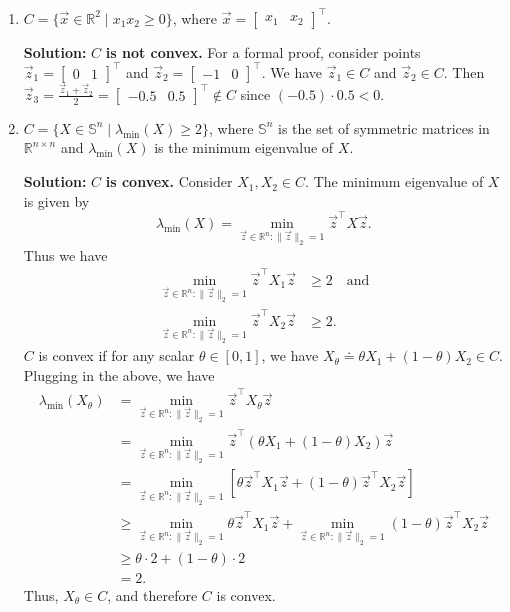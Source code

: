 \documentclass[10pt]{article}
\theoremstyle{definition}
\theoremstyle{plain}
\newcommand{\RR}{\mathbb{R}}
\begin{document}
\begin{enumerate}[label=(\alph*)]
    \item $C = \{\vec{x} \in \RR^2 \mid x_1 x_2 \ge 0\}$, where $\vec{x} = \begin{bmatrix} x_1 & x_2 \end{bmatrix}^\top$.

    \textbf{Solution:} $C$ \textbf{is not convex.} For a formal proof, consider points $\vec{z}_1 = \begin{bmatrix} 0 & 1 \end{bmatrix}^\top$ and $\vec{z}_2 = \begin{bmatrix} -1 & 0 \end{bmatrix}^\top$. We have $\vec{z}_1 \in C$ and $\vec{z}_2 \in C$. Then $\vec{z}_3 = \frac{\vec{z}_1 + \vec{z}_2}{2} = \begin{bmatrix} -0.5 & 0.5 \end{bmatrix}^\top \notin C$ since $(-0.5) \cdot 0.5 < 0$.

    \item $C = \{X \in \mathbb{S}^n \mid \lambda_{\min}(X) \ge 2\}$, where $\mathbb{S}^n$ is the set of symmetric matrices in $\RR^{n \times n}$ and $\lambda_{\min}(X)$ is the minimum eigenvalue of $X$.

    \textbf{Solution:} $C$ \textbf{is convex.} Consider $X_1, X_2 \in C$. The minimum eigenvalue of $X$ is given by
    \begin{equation}
        \lambda_{\min}(X) = \min_{\vec{z} \in \RR^n : \|\vec{z}\|_2 = 1} \vec{z}^\top X \vec{z}.
    \end{equation}
    Thus we have
    \begin{align}
        \min_{\vec{z} \in \RR^n : \|\vec{z}\|_2 = 1} \vec{z}^\top X_1 \vec{z} &\ge 2 \quad \text{and} \\
        \min_{\vec{z} \in \RR^n : \|\vec{z}\|_2 = 1} \vec{z}^\top X_2 \vec{z} &\ge 2.
    \end{align}
    $C$ is convex if for any scalar $\theta \in [0,1]$, we have $X_\theta \doteq \theta X_1 + (1-\theta)X_2 \in C$. Plugging in the above, we have
    \begin{align}
        \lambda_{\min}(X_\theta) &= \min_{\vec{z} \in \RR^n : \|\vec{z}\|_2 = 1} \vec{z}^\top X_\theta \vec{z} \\
        &= \min_{\vec{z} \in \RR^n : \|\vec{z}\|_2 = 1} \vec{z}^\top (\theta X_1 + (1-\theta)X_2) \vec{z} \\
        &= \min_{\vec{z} \in \RR^n : \|\vec{z}\|_2 = 1} \left[\theta \vec{z}^\top X_1 \vec{z} + (1-\theta) \vec{z}^\top X_2 \vec{z}\right] \\
        &\ge \min_{\vec{z} \in \RR^n : \|\vec{z}\|_2 = 1} \theta \vec{z}^\top X_1 \vec{z} + \min_{\vec{z} \in \RR^n : \|\vec{z}\|_2 = 1} (1-\theta) \vec{z}^\top X_2 \vec{z} \\
        &\ge \theta \cdot 2 + (1-\theta) \cdot 2 \\
        &= 2.
    \end{align}
    Thus, $X_\theta \in C$, and therefore $C$ is convex.


\end{enumerate}
\end{document}
